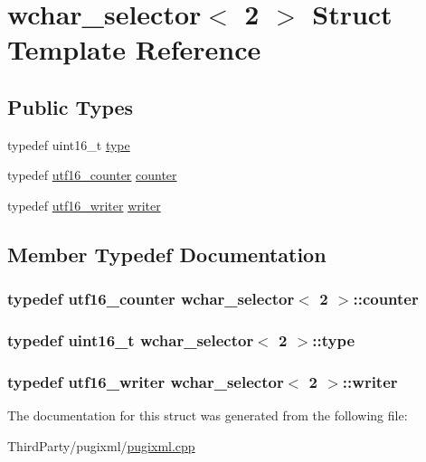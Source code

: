 \hypertarget{structwchar__selector_3_012_01_4}{\section{wchar\-\_\-selector$<$ 2 $>$ Struct Template Reference}
\label{structwchar__selector_3_012_01_4}
}
\subsection*{Public Types}
\begin{DoxyCompactItemize}
\item 
typedef uint16\-\_\-t \hyperlink{structwchar__selector_3_012_01_4_a60517f9b159ad60977ca7c3d2739c168}{type}
\item 
typedef \hyperlink{structutf16__counter}{utf16\-\_\-counter} \hyperlink{structwchar__selector_3_012_01_4_a108682c81b16127f3bec2501f02cb9d8}{counter}
\item 
typedef \hyperlink{structutf16__writer}{utf16\-\_\-writer} \hyperlink{structwchar__selector_3_012_01_4_af84979f9b8cd883798fe4e99820d6073}{writer}
\end{DoxyCompactItemize}


\subsection{Member Typedef Documentation}
\hypertarget{structwchar__selector_3_012_01_4_a108682c81b16127f3bec2501f02cb9d8}{
\subsubsection[{counter}]{\setlength{\rightskip}{0pt plus 5cm}typedef {\bf utf16\-\_\-counter} {\bf wchar\-\_\-selector}$<$ 2 $>$\-::{\bf counter}}}\label{structwchar__selector_3_012_01_4_a108682c81b16127f3bec2501f02cb9d8}
\hypertarget{structwchar__selector_3_012_01_4_a60517f9b159ad60977ca7c3d2739c168}{
\subsubsection[{type}]{\setlength{\rightskip}{0pt plus 5cm}typedef uint16\-\_\-t {\bf wchar\-\_\-selector}$<$ 2 $>$\-::{\bf type}}}\label{structwchar__selector_3_012_01_4_a60517f9b159ad60977ca7c3d2739c168}
\hypertarget{structwchar__selector_3_012_01_4_af84979f9b8cd883798fe4e99820d6073}{
\subsubsection[{writer}]{\setlength{\rightskip}{0pt plus 5cm}typedef {\bf utf16\-\_\-writer} {\bf wchar\-\_\-selector}$<$ 2 $>$\-::{\bf writer}}}\label{structwchar__selector_3_012_01_4_af84979f9b8cd883798fe4e99820d6073}


The documentation for this struct was generated from the following file\-:\begin{DoxyCompactItemize}
\item 
Third\-Party/pugixml/\hyperlink{pugixml_8cpp}{pugixml.\-cpp}\end{DoxyCompactItemize}
